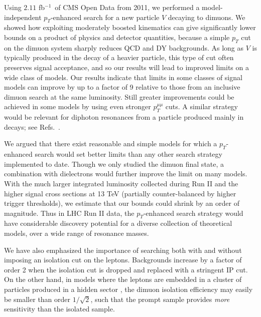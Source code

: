 \documentclass[aps,prd,twocolumn,superscriptaddress,preprintnumbers,nofootinbib,longbibliography,floatfix]{revtex4-1}
\newcommand{\nameofsearch}{$p_T$-enhanced }
\newcommand{\ptmm}{p_T^{\mu\mu}}
\newcommand{\inv}{$^{-1}$}
\DeclareRobustCommand{\Refs}[1]{Refs.~\cite{#1}}
\begin{document}
Using $2.11$ fb\inv\ of CMS Open Data from 2011, we performed a model-independent \nameofsearch search for a new particle $V$ decaying to dimuons.
%
We showed how exploiting moderately boosted kinematics can give significantly lower bounds on a product of physics and detector quantities, because a simple $p_T$ cut on the dimuon system sharply reduces QCD and DY backgrounds.
%
As long as $V$ is typically produced in the decay of a heavier particle, this type of cut often preserves signal acceptance, and so our results will lead to improved limits on a wide class of models.
%  
Our results indicate that limits in some classes of signal models can improve by up to a factor of 9 relative to those from an inclusive dimuon search at the same luminosity.
%
Still greater improvements could be achieved in some models by using even stronger $\ptmm$ cuts. 
%
A similar strategy would be relevant for diphoton resonances from a particle produced mainly in decays; see \Refs{Strassler:2006im,Chang:2006bw,Juknevich:2009ji}. 


We argued that there exist reasonable and simple models for which a \nameofsearch  search would set better limits than any other search strategy implemented to date.
%
Though we only studied the dimuon final state, a combination with dielectrons would further improve the limit on many models.
%
With the much  larger integrated luminosity collected during Run II and the higher signal cross sections at 13 TeV (partially counter-balanced by higher trigger thresholds), we estimate that our bounds could shrink by an order of magnitude.
%
Thus  in LHC Run II data, the \nameofsearch search strategy would have considerable discovery potential for a diverse collection of theoretical models, over a wide range of resonance masses.


We have also emphasized the importance of searching both with and without imposing an isolation cut on the leptons.
%
Backgrounds increase by a factor of order 2 when the isolation cut is dropped and replaced with a stringent IP cut.
%
On the other hand, in models where the leptons are embedded in a cluster of particles produced in a hidden sector \cite{Strassler:2006im,Han:2007ae,Baumgart:2009tn}, the dimuon isolation efficiency may easily be smaller than order $1/\sqrt{2}$, such that the prompt sample provides {\it more} sensitivity than the isolated sample.
\end{document}
